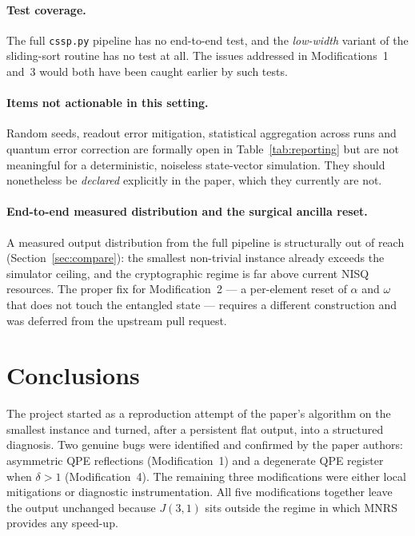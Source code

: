 \documentclass[11pt,a4paper]{article}
\begin{document}
\paragraph{Test coverage.}
The full \texttt{cssp.py} pipeline has no end-to-end test, and the
\emph{low-width} variant of the sliding-sort routine has no test
at all. The issues addressed in Modifications~1 and~3 would both
have been caught earlier by such tests.

\paragraph{Items not actionable in this setting.}
Random seeds, readout error mitigation, statistical aggregation
across runs and quantum error correction are formally open in
Table~\ref{tab:reporting} but are not meaningful for a
deterministic, noiseless state-vector simulation. They should
nonetheless be \emph{declared} explicitly in the paper, which
they currently are not.

\paragraph{End-to-end measured distribution and the surgical
ancilla reset.}
A measured output distribution from the full pipeline is
structurally out of reach (Section~\ref{sec:compare}): the smallest
non-trivial instance already exceeds the simulator ceiling, and the
cryptographic regime is far above current NISQ resources. The
proper fix for Modification~2 --- a per-element reset of $\alpha$
and $\omega$ that does not touch the entangled state --- requires
a different construction and was deferred from the upstream pull
request.

\section{Conclusions}
\label{sec:concl}

The project started as a reproduction attempt of the paper's algorithm on the smallest instance and turned, after a persistent flat output, into a structured diagnosis. Two genuine bugs were identified and confirmed by the paper authors: asymmetric QPE reflections (Modification~1) and a degenerate QPE register when $\delta > 1$ (Modification~4). The remaining three modifications were either local mitigations or diagnostic instrumentation. All five modifications together leave the output unchanged because $J(3,1)$ sits outside the regime in which MNRS provides any speed-up.
\end{document}
